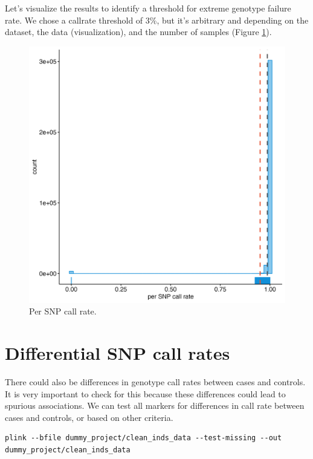 \documentclass[
]{book}
\begin{document}
Let's visualize the results to identify a threshold for extreme genotype failure rate. We chose a callrate threshold of 3\%, but it's arbitrary and depending on the dataset, the data (visualization), and the number of samples (Figure \ref{fig:showsnpcallrate}).

\begin{figure}[H]

{\centering \includegraphics[width=0.85\linewidth]{img/_gwas_dummy/show-snp-callrate} 

}

\caption{Per SNP call rate.}\label{fig:showsnpcallrate}
\end{figure}

\hypertarget{differential-snp-call-rates}{%
\section{Differential SNP call rates}\label{differential-snp-call-rates}}

There could also be differences in genotype call rates between cases and controls. It is very important to check for this because these differences could lead to spurious associations. We can test all markers for differences in call rate between cases and controls, or based on other criteria.

\begin{lstlisting}
plink --bfile dummy_project/clean_inds_data --test-missing --out dummy_project/clean_inds_data
\end{lstlisting}
\end{document}
